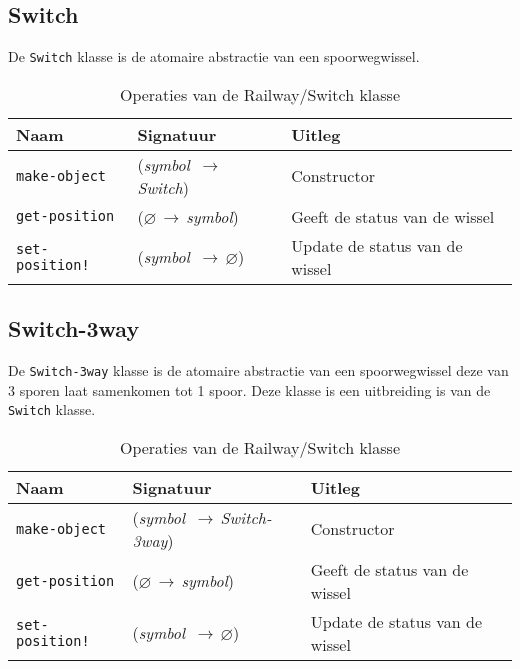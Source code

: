\documentclass[a4paper, 11pt]{article}
\newcommand{\naar}{\,$\rightarrow$\,}
\renewcommand{\empty}{$\varnothing$}
\newcommand{\<}{\scriptsize\textless\normalsize}
\renewcommand{\>}{\scriptsize\textgreater\normalsize}
\begin{document}
\subsection{Switch} %
De \texttt{Switch} klasse is de atomaire abstractie van een spoorwegwissel.
\begin{table}[H]
	\begin{center}
		{
		\begin{tabular}{|l l l|}
			\hline
			\textbf{Naam} & \textbf{Signatuur} & \textbf{Uitleg}\\
			\hline
			\texttt{make-object} & (\textit{symbol} \naar \textit{Switch}) & Constructor\\
			\hline
			\texttt{get-position} & (\empty \naar \textit{symbol}) & Geeft de status van de wissel\\
			\texttt{set-position!} & (\textit{symbol} \naar \empty) & Update de status van de wissel\\
			\hline
		\end{tabular}}
		\caption{Operaties van de Railway/Switch klasse}
	\end{center}
\end{table}

\newpage

\subsection{Switch-3way} %
De \texttt{Switch-3way} klasse is de atomaire abstractie van een spoorwegwissel deze van 3 sporen laat samenkomen tot 1 spoor. Deze klasse is een uitbreiding is van de \texttt{Switch} klasse.
\begin{table}[H]
	\begin{center}
		{
		\begin{tabular}{|l l l|}
			\hline
			\textbf{Naam} & \textbf{Signatuur} & \textbf{Uitleg}\\
			\hline
			\texttt{make-object} & (\textit{symbol} \naar \textit{Switch-3way}) & Constructor\\
			\hline
			\texttt{get-position} & (\empty \naar \textit{symbol}) & Geeft de status van de wissel\\
			\texttt{set-position!} & (\textit{symbol} \naar \empty) & Update de status van de wissel\\
			\hline
		\end{tabular}}
		\caption{Operaties van de Railway/Switch klasse}
	\end{center}
\end{table}
\end{document}
